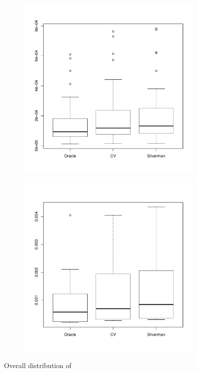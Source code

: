 \begin{figure}[htbp]
    \centering
    \begin{subfigure}[t]{0.45\textwidth}
        \includegraphics[width=\textwidth]{results/by_overall/normalized-sup-error-boxplot}
        \label{fig:discussion:overall_nsup_boxplot:unif}
    \end{subfigure}
    \begin{subfigure}[t]{0.45\textwidth}
        \includegraphics[width=\textwidth]{results/by_overall/normalized-sup-error-peakpop-boxplot}
        \label{fig:discussion:overall_nsup_boxplot:peak}
    \end{subfigure}
    \caption{Overall distribution of }
    \label{fig:discussion:overall_nsup_boxplot}
\end{figure}

